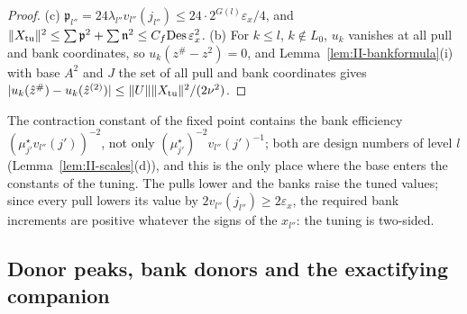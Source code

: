 \documentclass[10pt]{amsart}
\theoremstyle{definition}
\theoremstyle{remark}
\newcommand{\zh}{\hat z}
\begin{document}
\begin{proof}
(c) $\mathfrak p_{l''}=24\lambda_{l''}v_{l''}(j_{l''})\le24\cdot2^{G(l)}
\varepsilon_x/4$, and $\|X_{\rm tu}\|^2\le\sum\mathfrak p^2+\sum\mathfrak n^2
\le C_f\mathrm{Des}\,\varepsilon_x^2$.  (b) For $k\le l$, $k\notin L_0$,
$u_k$ vanishes at all pull and bank coordinates, so $u_k(z^\#-z^2)=0$, and
Lemma~\ref{lem:II-bankformula}(i) with base $A^2$ and $J$ the set of all pull
and bank coordinates gives $|u_k(\zh^\#)-u_k(\zh^{(2)})|\le\|U\|
\|X_{\rm tu}\|^2/(2\nu^2)$.
\end{proof}

The contraction constant of the fixed point contains the bank efficiency
$(\mu^\star_{j'}v_{l''}(j'))^{-2}$, not only $(\mu^\star_{j'})^{-2}
v_{l''}(j')^{-1}$; both are design numbers of level $l$
(Lemma~\ref{lem:II-scales}(d)), and this is the only place where the base
enters the constants of the tuning.  The pulls lower and the banks raise
the tuned values; since every pull lowers its value by
$2v_{l''}(j_{l''})\ge2\varepsilon_x$, the required bank increments are
positive whatever the signs of the $x_{l''}$: the tuning is two-sided.

\subsection{Donor peaks, bank donors and the exactifying companion}
\label{subsec:II-donors}\label{subsec:II-companion}
\end{document}
